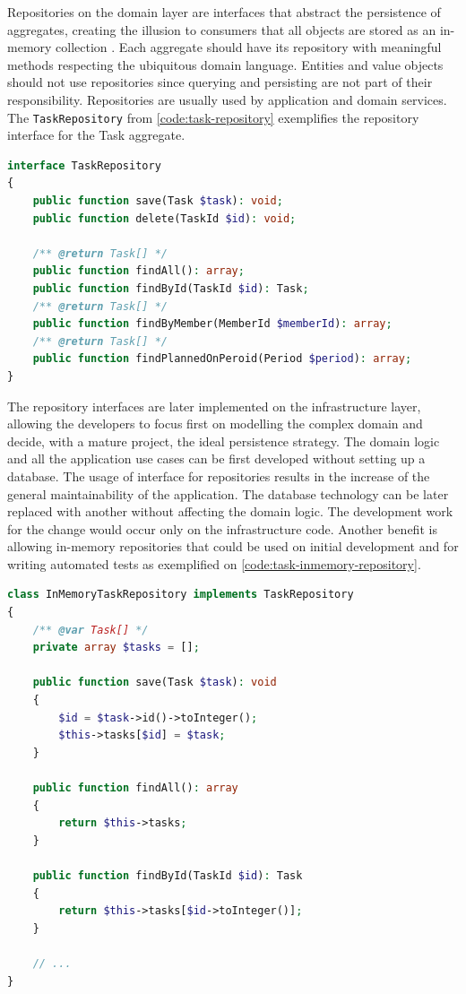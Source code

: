 Repositories on the domain layer are interfaces that abstract the persistence of aggregates, creating the illusion to consumers that all objects are stored as an in-memory collection \cite{ddd-blue-book}. Each aggregate should have its repository with meaningful methods respecting the ubiquitous domain language. Entities and value objects should not use repositories since querying and persisting are not part of their responsibility. Repositories are usually used by application and domain services. The \texttt{TaskRepository} from \autoref{code:task-repository} exemplifies the repository interface for the Task aggregate.

\begin{lstlisting}[language=PHP,label={code:task-repository},caption={Task repository interface.}]
interface TaskRepository
{
    public function save(Task $task): void;
    public function delete(TaskId $id): void;

    /** @return Task[] */
    public function findAll(): array;
    public function findById(TaskId $id): Task;
	/** @return Task[] */
	public function findByMember(MemberId $memberId): array;
    /** @return Task[] */
	public function findPlannedOnPeroid(Period $period): array;
}
\end{lstlisting}

The repository interfaces are later implemented on the infrastructure layer, allowing the developers to focus first on modelling the complex domain and decide, with a mature project, the ideal persistence strategy. The domain logic and all the application use cases can be first developed without setting up a database. The usage of interface for repositories results in the increase of the general maintainability of the application. The database technology can be later replaced with another without affecting the domain logic. The development work for the change would occur only on the infrastructure code. Another benefit is allowing in-memory repositories that could be used on initial development and for writing automated tests as exemplified on \autoref{code:task-inmemory-repository}.

\begin{lstlisting}[language=PHP,label={code:task-inmemory-repository},caption={In-memory implementation of the \texttt{TaskRepository}.}]
class InMemoryTaskRepository implements TaskRepository
{
	/** @var Task[] */
	private array $tasks = [];

	public function save(Task $task): void
	{
		$id = $task->id()->toInteger();
		$this->tasks[$id] = $task;
	}

	public function findAll(): array
	{
		return $this->tasks;
	}

	public function findById(TaskId $id): Task
	{
		return $this->tasks[$id->toInteger()];
	}

	// ...
}
\end{lstlisting}

